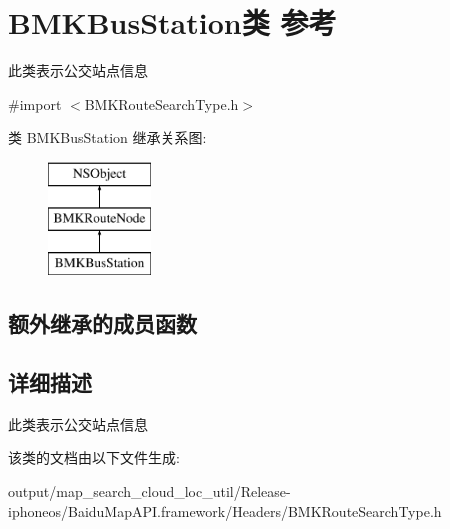 \hypertarget{interface_b_m_k_bus_station}{}\section{B\+M\+K\+Bus\+Station类 参考}
\label{interface_b_m_k_bus_station}


此类表示公交站点信息  




{\ttfamily \#import $<$B\+M\+K\+Route\+Search\+Type.\+h$>$}

类 B\+M\+K\+Bus\+Station 继承关系图\+:\begin{figure}[H]
\begin{center}
\leavevmode
\includegraphics[height=3.000000cm]{interface_b_m_k_bus_station}
\end{center}
\end{figure}
\subsection*{额外继承的成员函数}


\subsection{详细描述}
此类表示公交站点信息 

该类的文档由以下文件生成\+:\begin{DoxyCompactItemize}
\item 
output/map\+\_\+search\+\_\+cloud\+\_\+loc\+\_\+util/\+Release-\/iphoneos/\+Baidu\+Map\+A\+P\+I.\+framework/\+Headers/B\+M\+K\+Route\+Search\+Type.\+h\end{DoxyCompactItemize}
